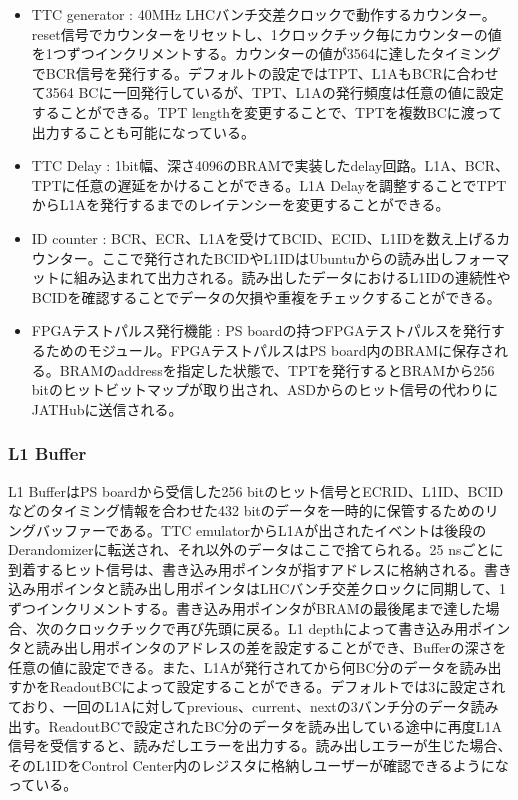 \begin{itemize}
    \item {TTC generator : } 40MHz LHCバンチ交差クロックで動作するカウンター。reset信号でカウンターをリセットし、1クロックチック毎にカウンターの値を1つずつインクリメントする。カウンターの値が3564に達したタイミングでBCR信号を発行する。デフォルトの設定ではTPT、L1AもBCRに合わせて3564 BCに一回発行しているが、TPT、L1Aの発行頻度は任意の値に設定することができる。TPT lengthを変更することで、TPTを複数BCに渡って出力することも可能になっている。
    \baselineskip

    \item{TTC Delay : }1bit幅、深さ4096のBRAMで実装したdelay回路。L1A、BCR、TPTに任意の遅延をかけることができる。L1A Delayを調整することでTPTからL1Aを発行するまでのレイテンシーを変更することができる。
    \baselineskip

    \item{ID counter : }BCR、ECR、L1Aを受けてBCID、ECID、L1IDを数え上げるカウンター。ここで発行されたBCIDやL1IDはUbuntuからの読み出しフォーマットに組み込まれて出力される。読み出したデータにおけるL1IDの連続性やBCIDを確認することでデータの欠損や重複をチェックすることができる。
    \baselineskip
    
    \item{FPGAテストパルス発行機能 : }PS boardの持つFPGAテストパルスを発行するためのモジュール。FPGAテストパルスはPS board内のBRAMに保存される。BRAMのaddressを指定した状態で、TPTを発行するとBRAMから256 bitのヒットビットマップが取り出され、ASDからのヒット信号の代わりにJATHubに送信される。
    \baselineskip
\end{itemize}

\subsubsection{L1 Buffer} \par
L1 BufferはPS boardから受信した256 bitのヒット信号とECRID、L1ID、BCIDなどのタイミング情報を合わせた432 bitのデータを一時的に保管するためのリングバッファーである。TTC emulatorからL1Aが出されたイベントは後段のDerandomizerに転送され、それ以外のデータはここで捨てられる。25 nsごとに到着するヒット信号は、書き込み用ポインタが指すアドレスに格納される。書き込み用ポインタと読み出し用ポインタはLHCバンチ交差クロックに同期して、1ずつインクリメントする。書き込み用ポインタがBRAMの最後尾まで達した場合、次のクロックチックで再び先頭に戻る。L1 depthによって書き込み用ポインタと読み出し用ポインタのアドレスの差を設定することができ、Bufferの深さを任意の値に設定できる。また、L1Aが発行されてから何BC分のデータを読み出すかをReadoutBCによって設定することができる。デフォルトでは3に設定されており、一回のL1Aに対してprevious、current、nextの3バンチ分のデータ読み出す。ReadoutBCで設定されたBC分のデータを読み出している途中に再度L1A信号を受信すると、読みだしエラーを出力する。読み出しエラーが生じた場合、そのL1IDをControl Center内のレジスタに格納しユーザーが確認できるようになっている。
\baselineskip

